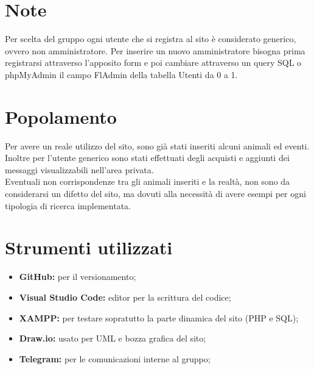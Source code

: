 \appendix
    \section{Note}
    Per scelta del gruppo ogni utente che si registra al sito è considerato generico, ovvero non amministratore. Per inserire un nuovo amministratore bisogna prima registrarsi attraverso l'apposito form e poi cambiare attraverso un query SQL o phpMyAdmin il campo FlAdmin della tabella Utenti da 0 a 1.

    \section{Popolamento}
    Per avere un reale utilizzo del sito, sono già stati inseriti alcuni animali ed eventi. Inoltre per l'utente generico sono stati effettuati degli acquisti e aggiunti dei messaggi visualizzabili nell'area privata.\\
    Eventuali non corrispondenze tra gli animali inseriti e la realtà, non sono da considerarsi un difetto del sito, ma dovuti alla necessità di avere esempi per ogni tipologia di ricerca implementata.

    \section{Strumenti utilizzati}
    \begin{itemize}
        \item \textbf{GitHub:} per il versionamento; 
        \item \textbf{Visual Studio Code:} editor per la scrittura del codice; 
        \item \textbf{XAMPP:} per testare sopratutto la parte dinamica del sito (PHP e SQL);
        \item \textbf{Draw.io:} usato per UML e bozza grafica del sito;
        \item \textbf{Telegram:} per le comunicazioni interne al gruppo;
    \end{itemize}
\pagebreak